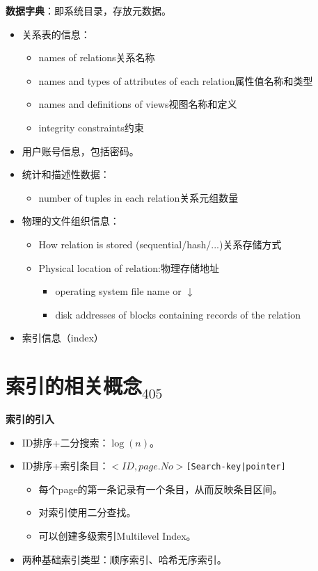 \documentclass[b5paper, twoside]{article}
\let\oldtextbf\textbf
\renewcommand{\textbf}[1]{\textcolor{myblue}{\oldtextbf{#1}}}
\begin{document}
\textbf{数据字典}：即系统目录，存放元数据。
\begin{itemize}
	\item {关系表的信息}：
	\begin{itemize}
		\item names of relations关系名称
		\item names and types of attributes of each relation属性值名称和类型
		\item names and definitions of views视图名称和定义
		\item integrity constraints约束
	\end{itemize}
	\item {用户账号信息}，包括密码。
	\item {统计和描述性数据}：
	\begin{itemize}
		\item number of tuples in each relation关系元组数量
	\end{itemize}
	\item {物理的文件组织信息}：
	\begin{itemize}
		\item How relation is stored (sequential/hash/...)关系存储方式
		\item Physical location of relation:物理存储地址
		\begin{itemize}
			\item operating system file name or $\downarrow$
			\item disk addresses of blocks containing records of the relation
		\end{itemize}
	\end{itemize}
	\item {索引信息（index）}
\end{itemize}


\section{索引的相关概念$_{405}$}

\textbf{索引的引入}
\begin{itemize}
    \item ID排序+二分搜索：$\log(n)$。
    \item ID排序+索引条目：$<ID, page.No>$\lstinline{[Search-key|pointer]}
    \begin{itemize}
        \item 每个page的第一条记录有一个条目，从而反映条目区间。
        \item 对索引使用二分查找。
        \item 可以创建多级索引Multilevel Index。
    \end{itemize}
    \item 两种基础索引类型：顺序索引、哈希无序索引。
\end{itemize}
\end{document}
